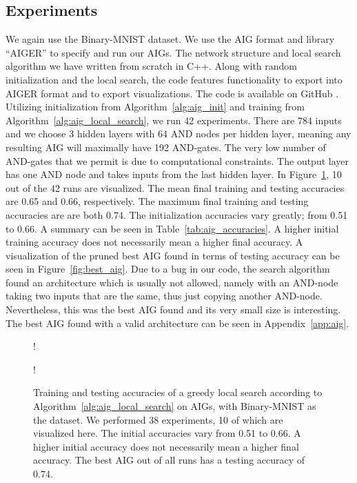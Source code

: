 \subsection{Experiments}
We again use the Binary-MNIST dataset. We use the AIG format and library \enquote{AIGER} \cite{bib:Biere-FMV-TR-07-1} to specify and run our AIGs. The network structure and local search algorithm we have written from scratch in C++. Along with random initialization and the local search, the code features functionality to export into AIGER format and to export visualizations. The code is available on GitHub \cite{bib:aig_github}. Utilizing initialization from Algorithm~\ref{alg:aig_init} and training from Algorithm~\ref{alg:aig_local_search}, we run 42 experiments. There are 784 inputs and we choose 3 hidden layers with 64 AND nodes per hidden layer, meaning any resulting AIG will maximally have 192 AND-gates. The very low number of AND-gates that we permit is due to computational constraints. The output layer has one AND node and takes inputs from the last hidden layer. In Figure~\ref{fig:aig_exp_result}, 10 out of the 42 runs are visualized. The mean final training and testing accuracies are 0.65 and 0.66, respectively. The maximum final training and testing accuracies are are both 0.74. The initialization accuracies vary greatly; from 0.51 to 0.66. A summary can be seen in Table~\ref{tab:aig_accuracies}. A higher initial training accuracy does not necessarily mean a higher final accuracy. A visualization of the pruned best AIG found in terms of testing accuracy can be seen in Figure~\ref{fig:best_aig}. Due to a bug in our code, the search algorithm found an architecture which is usually not allowed, namely with an AND-node taking two inputs that are the same, thus just copying another AND-node. Nevertheless, this was the best AIG found and its very small size is interesting. The best AIG found with a valid architecture can be seen in Appendix~\ref{app:aig}.

\begin{figure}[!htb]
    \centering
  \begin{minipage}[b]{.49\linewidth}
    \resizebox {1\textwidth} {!} {
    
    }
    \label{fig:aix_exp_result:train}
  \end{minipage}
  \begin{minipage}[b]{.49\linewidth}
    \resizebox {1\textwidth} {!} {
    
    }
    \label{fig:aig_exp_result:test}
  \end{minipage}
  \caption{Training and testing accuracies of a greedy local search according to Algorithm~\ref{alg:aig_local_search} on AIGs, with Binary-MNIST as the dataset. We performed 38 experiments, 10 of which are visualized here. The initial accuracies vary from 0.51 to 0.66. A higher initial accuracy does not necessarily mean a higher final accuracy. The best AIG out of all runs has a testing accuracy of 0.74.}
\label{fig:aig_exp_result}
\end{figure}
\FloatBarrier

